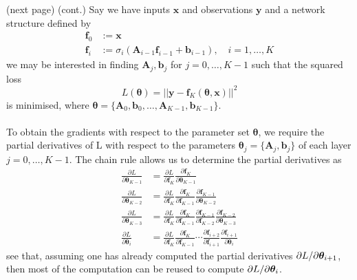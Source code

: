 \documentclass{report}
\begin{document}
(next page)
\newpage
\noindent(cont.) Say we have inputs $\bm{x}$ and observations $\bm{y}$ and a network structure defined by
\begin{align*}
\bm{f}_0&:=\bm{x}\\
\bm{f}_i&:=\sigma_i(\bm{A}_{i-1}\bm{f}_{i-1}+\bm{b}_{i-1}),\quad
i=1,\ldots,K
\end{align*}
we may be interested in finding $\bm{A}_j,\bm{b}_j$ for $j=0,\ldots,K-1$ such that the squared loss
\begin{equation*}
L(\bm{\theta})=||\bm{y}-\bm{f}_K(\bm{\theta},\bm{x})||^2
\end{equation*}
is minimised, where $\bm{\theta}=\{\bm{A}_0,\bm{b}_0,\ldots,
\bm{A}_{K-1},\bm{b}_{K-1}\}$.\\
\vspace{1mm}\\
To obtain the gradients with respect to the parameter set $\bm{\theta}$, we require the partial derivatives of L with
respect to the parameters $\bm{\theta}_j=\{\bm{A}_j,\bm{b}_j\}$
of each layer $j=0,\ldots,K-1$. The chain rule allows us to determine the partial derivatives as
\begin{align*}
\frac{\partial L}{\partial\bm{\theta}_{K-1}}&=
\frac{\partial L}{\partial\bm{f}_K}\frac{\partial\bm{f}_K}{\partial\bm{\theta}_{K-1}}\\
\frac{\partial L}{\partial\bm{\theta}_{K-2}}&=
\frac{\partial L}{\partial\bm{f}_K}\frac{\partial\bm{f}_K}{\partial\bm{f}_{K-1}}
\frac{\partial\bm{f}_{K-1}}{\partial\bm{\theta}_{K-2}}\\
\frac{\partial L}{\partial\bm{\theta}_{K-3}}&=
\frac{\partial L}{\partial\bm{f}_K}\frac{\partial\bm{f}_K}{\partial\bm{f}_{K-1}}
\frac{\partial\bm{f}_{K-1}}{\partial\bm{f}_{K-2}}
\frac{\partial\bm{f}_{K-2}}{\partial\bm{\theta}_{K-3}}\\
\frac{\partial L}{\partial\bm{\theta}_i}&=
\frac{\partial L}{\partial\bm{f}_K}
\frac{\partial\bm{f}_K}{\partial\bm{f}_{K-1}}\cdots
\frac{\partial\bm{f}_{i+2}}{\partial\bm{f}_{i+1}}
\frac{\partial\bm{f}_{i+1}}{\partial\bm{\theta}_{i}}
\end{align*}
see that, assuming one has already computed the partial derivatives $\partial L/\partial\bm{\theta_}{i+1}$, then most 
of the computation can be reused to compute $\partial L/\partial\bm{\theta_}{i}$.
\newpage
\end{document}
